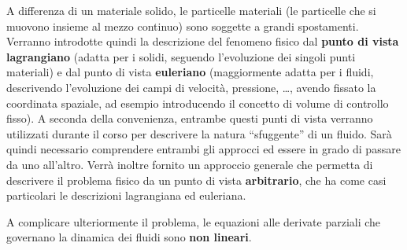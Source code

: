 A differenza di un materiale solido, le particelle materiali (le particelle che si muovono insieme al mezzo continuo) sono soggette a grandi spostamenti. Verranno introdotte quindi la descrizione del fenomeno fisico dal \textbf{punto di vista lagrangiano} (adatta per i solidi, seguendo l'evoluzione dei singoli punti materiali) e dal punto di vista \textbf{euleriano} (maggiormente adatta per i fluidi, descrivendo l'evoluzione dei campi di velocità, pressione, \dots, avendo fissato la coordinata spaziale, ad esempio introducendo il concetto di volume di controllo fisso). A seconda della convenienza, entrambe questi punti di vista verranno utilizzati durante il corso per descrivere la natura ``sfuggente'' di un fluido. Sarà quindi necessario comprendere entrambi gli approcci ed essere in grado di passare da uno all'altro. Verrà inoltre fornito un approccio generale che permetta di descrivere il problema fisico da un punto di vista \textbf{arbitrario}, che ha come casi particolari le descrizioni lagrangiana ed euleriana.

A complicare ulteriormente il problema, le equazioni alle derivate parziali che governano la dinamica dei fluidi sono \textbf{non lineari}.

